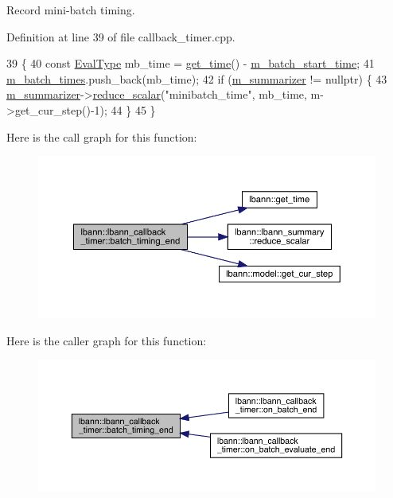 Record mini-\/batch timing. 

Definition at line 39 of file callback\+\_\+timer.\+cpp.


\begin{DoxyCode}
39                                                     \{
40   \textcolor{keyword}{const} \hyperlink{base_8hpp_a3266f5ac18504bbadea983c109566867}{EvalType} mb\_time = \hyperlink{namespacelbann_a478d36031ff0659893c4322cd856157f}{get\_time}() - \hyperlink{classlbann_1_1lbann__callback__timer_a56a597dea5c6649442311dc15ee6d06f}{m\_batch\_start\_time};
41   \hyperlink{classlbann_1_1lbann__callback__timer_ae20dcc6bf921444e2724478ba751ade1}{m\_batch\_times}.push\_back(mb\_time);
42   \textcolor{keywordflow}{if} (\hyperlink{classlbann_1_1lbann__callback_a277d46138184f85f161a8263b8322c76}{m\_summarizer} != \textcolor{keyword}{nullptr}) \{
43     \hyperlink{classlbann_1_1lbann__callback_a277d46138184f85f161a8263b8322c76}{m\_summarizer}->\hyperlink{classlbann_1_1lbann__summary_a3e0b9aae1f80403a195567fd25ea2525}{reduce\_scalar}(\textcolor{stringliteral}{"minibatch\_time"}, mb\_time, m->get\_cur\_step()-1);
44   \}
45 \}
\end{DoxyCode}
Here is the call graph for this function\+:\nopagebreak
\begin{figure}[H]
\begin{center}
\leavevmode
\includegraphics[width=350pt]{classlbann_1_1lbann__callback__timer_afbf58bd4e1b4c1bcae2e50f78c9507f0_cgraph}
\end{center}
\end{figure}
Here is the caller graph for this function\+:\nopagebreak
\begin{figure}[H]
\begin{center}
\leavevmode
\includegraphics[width=350pt]{classlbann_1_1lbann__callback__timer_afbf58bd4e1b4c1bcae2e50f78c9507f0_icgraph}
\end{center}
\end{figure}

